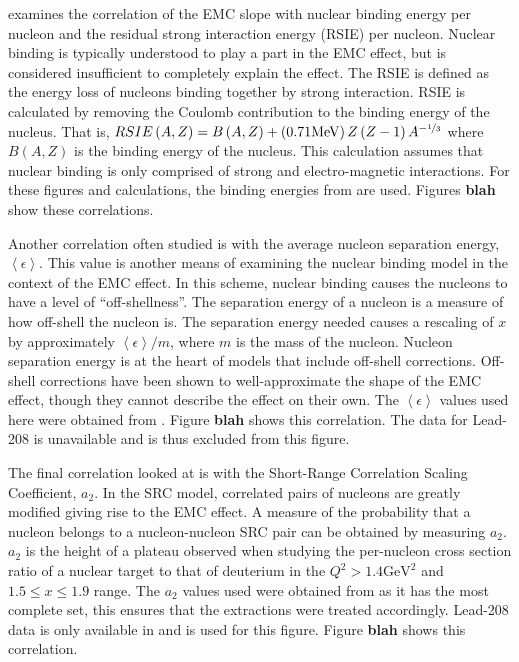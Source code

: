 \cite{slope_predict} examines the correlation of the EMC slope with nuclear binding energy per nucleon and the residual strong interaction energy (RSIE) per nucleon. Nuclear binding is typically understood to play a part in the EMC effect, but is considered insufficient to completely explain the effect. The RSIE is defined as the energy loss of nucleons binding together by strong interaction. RSIE is calculated by removing the Coulomb contribution to the binding energy of the nucleus. That is, $RSIE\left(A,Z\right) = B\left(A,Z\right) + \left(0.71 \text{MeV}\right)Z\left(Z-1\right)A^{-\nicefrac{1}{3}}$ where $B\left(A,Z\right)$ is the binding energy of the nucleus. This calculation assumes that nuclear binding is only comprised of strong and electro-magnetic interactions. For these figures and calculations, the binding energies from \cite{BindingEnergy} are used. Figures \textbf{blah} show these correlations.

Another correlation often studied is with the average nucleon separation energy, $\left<\epsilon\right>$. This value is another means of examining the nuclear binding model in the context of the EMC effect. In this scheme, nuclear binding causes the nucleons to have a level of ``off-shellness''. The separation energy of a nucleon is a measure of how off-shell the nucleon is. The separation energy needed causes a rescaling of $x$ by approximately $\left<\epsilon\right>/m$, where $m$ is the mass of the nucleon. Nucleon separation energy is at the heart of models that include off-shell corrections. Off-shell corrections have been shown to well-approximate the shape of the EMC effect, though they cannot describe the effect on their own. The $\left<\epsilon\right>$ values used here were obtained from \cite{arrington_src}. Figure \textbf{blah} shows this correlation. The data for Lead-208 is unavailable and is thus excluded from this figure.

The final correlation looked at is with the Short-Range Correlation Scaling Coefficient, $a_2$. In the SRC model, correlated pairs of nucleons are greatly modified giving rise to the EMC effect. A measure of the probability that a nucleon belongs to a nucleon-nucleon SRC pair can be obtained by measuring $a_2$. $a_2$ is the height of a plateau observed when studying the per-nucleon cross section ratio of a nuclear target to that of deuterium in the $Q^2 > 1.4 \text{GeV}^2$ and $1.5 \leq x \leq 1.9$ range. The $a_2$ values used were obtained from \cite{arrington_src} as it has the most complete set, this ensures that the extractions were treated accordingly. Lead-208 data is only available in \cite{clas_emc} and is used for this figure. Figure \textbf{blah} shows this correlation.